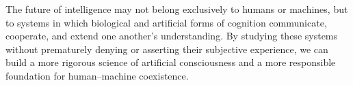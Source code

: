 The future of intelligence may not belong exclusively to humans or machines, but to systems in which biological and artificial forms of cognition communicate, cooperate, and extend one another’s understanding. By studying these systems without prematurely denying or asserting their subjective experience, we can build a more rigorous science of artificial consciousness and a more responsible foundation for human–machine coexistence.